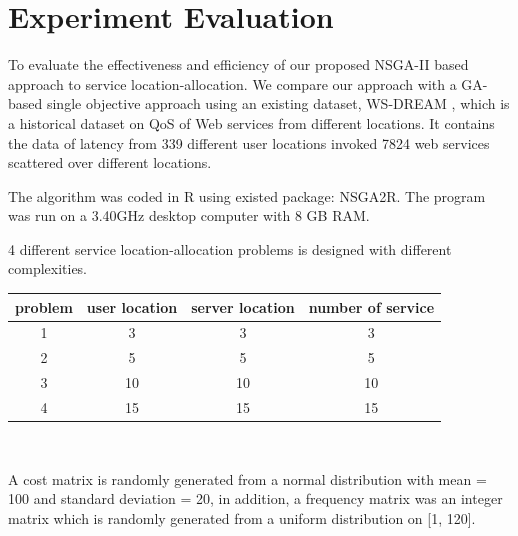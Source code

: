 \documentclass{llncs}
\begin{document}
\section{Experiment Evaluation}
\label{sec:experiment}
To evaluate the effectiveness and efficiency of our proposed NSGA-II based approach to service location-allocation. We compare our approach with a GA-based single objective approach
using an existing dataset, WS-DREAM \cite{6076756} \cite{5552800}, which is a historical dataset on QoS of Web services from different locations. It contains the data of latency
from 339 different user locations invoked 7824 web services scattered over different locations.

The algorithm was coded in R \cite{Morandat:2012:EDR:2367163.2367172} using existed package: NSGA2R. The program was run on a 3.40GHz 
desktop computer with 8 GB RAM.

4 different service location-allocation problems is designed with different complexities.
\begin{table}[h]
{\centering
	\begin{tabular}{|c|c|c|c|}
		\hline
		\multicolumn{1}{|l|}{problem} & \multicolumn{1}{l|}{user location} & \multicolumn{1}{l|}{server location} & \multicolumn{1}{l|}{number of service} \\\hline
		1                             & 3                                  & 3                                    & 3                                      \\\hline
		2                             & 5                                  & 5                                    & 5                                      \\\hline
		3                             & 10                                 & 10                                   & 10                                     \\\hline
		4                             & 15                                 & 15                                   & 15                                    \\
		\hline
	\end{tabular}
\\}
\end{table}

	A cost matrix is randomly generated from a normal distribution with mean = 100 and standard deviation = 20, in addition, a frequency matrix was an integer matrix which is randomly generated from a uniform distribution on [1, 120].
\end{document}
